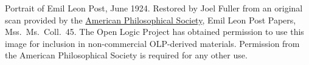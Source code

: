 Portrait of Emil Leon Post, June 1924. Restored by Joel Fuller
from an original scan provided by the
\href{https://amphilsoc.org/}{American Philosophical Society},
Emil Leon Post Papers, Mss.~Ms.~Coll.~45. The Open Logic Project has
obtained permission to use this image for inclusion in non-commercial
OLP-derived materials. Permission from the American Philosophical
Society is required for any other use.

